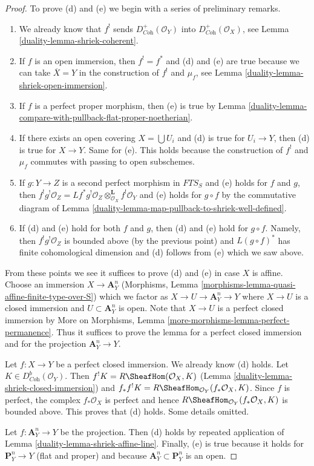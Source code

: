 \begin{proof}
\medskip\noindent
To prove (d) and (e) we begin with a series of preliminary remarks.
\begin{enumerate}
\item We already know that $f^!$ sends $D_{\textit{Coh}}^+(\mathcal{O}_Y)$
into $D_{\textit{Coh}}^+(\mathcal{O}_X)$, see
Lemma \ref{duality-lemma-shriek-coherent}.
\item If $f$ is an open immersion, then $f^! = f^*$ and (d) and (e)
are true because we can take $\overline{X} = Y$ in the construction
of $f^!$ and $\mu_f$, see Lemma \ref{duality-lemma-shriek-open-immersion}.
\item If $f$ is a perfect proper morphism, then (e) is true by
Lemma \ref{duality-lemma-compare-with-pullback-flat-proper-noetherian}.
\item If there exists an open covering $X = \bigcup U_i$ and (d) is
true for $U_i \to Y$, then (d) is true for $X \to Y$. Same for (e).
This holds because the construction of $f^!$ and $\mu_f$ commutes
with passing to open subschemes.
\item If $g : Y \to Z$ is a second perfect morphism in $\textit{FTS}_S$
and (e) holds for $f$ and $g$, then
$f^!g^!\mathcal{O}_Z =
Lf^*g^!\mathcal{O}_Z \otimes_{\mathcal{O}_X}^\mathbf{L} f^!\mathcal{O}_Y$
and (e) holds for $g \circ f$ by the commutative diagram
of Lemma \ref{duality-lemma-map-pullback-to-shriek-well-defined}.
\item If (d) and (e) hold for both $f$ and $g$, then
(d) and (e) hold for $g \circ f$. Namely, then $f^!g^!\mathcal{O}_Z$
is bounded above (by the previous point) and $L(g \circ f)^*$ has finite
cohomological dimension and (d) follows from (e) which we saw above.
\end{enumerate}
From these points we see it suffices to prove (d) and (e) in case $X$ is
affine. Choose an immersion $X \to \mathbf{A}^n_Y$
(Morphisms, Lemma \ref{morphisms-lemma-quasi-affine-finite-type-over-S})
which we factor as $X \to U \to \mathbf{A}^n_Y \to Y$ where $X \to U$
is a closed immersion and $U \subset \mathbf{A}^n_Y$ is open.
Note that $X \to U$ is a perfect closed immersion by
More on Morphisms, Lemma \ref{more-morphisms-lemma-perfect-permanence}.
Thus it suffices to prove the lemma for a perfect closed immersion
and for the projection $\mathbf{A}^n_Y \to Y$.

\medskip\noindent
Let $f : X \to Y$ be a perfect closed immersion. We already know (d) holds.
Let $K \in D^b_{\textit{Coh}}(\mathcal{O}_Y)$.
Then $f^!K = R\SheafHom(\mathcal{O}_X, K)$
(Lemma \ref{duality-lemma-shriek-closed-immersion})
and $f_*f^!K = R\SheafHom_{\mathcal{O}_Y}(f_*\mathcal{O}_X, K)$.
Since $f$ is perfect, the complex $f_*\mathcal{O}_X$ is perfect
and hence $R\SheafHom_{\mathcal{O}_Y}(f_*\mathcal{O}_X, K)$ is bounded above.
This proves that (d) holds. Some details omitted.

\medskip\noindent
Let $f : \mathbf{A}^n_Y \to Y$ be the projection. Then (d) holds
by repeated application of Lemma \ref{duality-lemma-shriek-affine-line}.
Finally, (e) is true because it holds for $\mathbf{P}^n_Y \to Y$
(flat and proper) and because $\mathbf{A}^n_Y \subset \mathbf{P}^n_Y$
is an open.
\end{proof}

